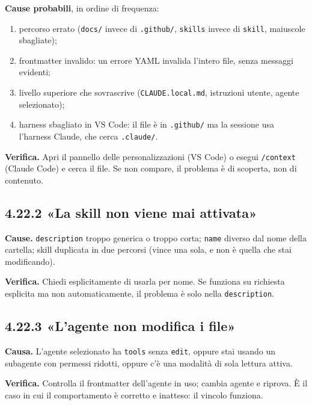 \documentclass[
  italian,
  10pt,
]{book}
\providecommand{\tightlist}{%
  \setlength{\itemsep}{0pt}\setlength{\parskip}{0pt}}
\begin{document}
\textbf{Cause probabili}, in ordine di frequenza:

\begin{enumerate}
\def\labelenumi{\arabic{enumi}.}
\tightlist
\item
  percorso errato (\texttt{docs/} invece di \texttt{.github/},
  \texttt{skills} invece di \texttt{skill}, maiuscole sbagliate);
\item
  frontmatter invalido: un errore YAML invalida l'intero file, senza
  messaggi evidenti;
\item
  livello superiore che sovrascrive (\texttt{CLAUDE.local.md},
  istruzioni utente, agente selezionato);
\item
  harness sbagliato in VS Code: il file è in \texttt{.github/} ma la
  sessione usa l'harness Claude, che cerca \texttt{.claude/}.
\end{enumerate}

\textbf{Verifica.} Apri il pannello delle personalizzazioni (VS Code) o
esegui \texttt{/context} (Claude Code) e cerca il file. Se non compare,
il problema è di scoperta, non di contenuto.

\subsection{4.22.2 «La skill non viene mai
attivata»}\label{la-skill-non-viene-mai-attivata}

\textbf{Cause.} \texttt{description} troppo generica o troppo corta;
\texttt{name} diverso dal nome della cartella; skill duplicata in due
percorsi (vince una sola, e non è quella che stai modificando).

\textbf{Verifica.} Chiedi esplicitamente di usarla per nome. Se funziona
su richiesta esplicita ma non automaticamente, il problema è solo nella
\texttt{description}.

\subsection{4.22.3 «L'agente non modifica i
file»}\label{lagente-non-modifica-i-file}

\textbf{Causa.} L'agente selezionato ha \texttt{tools} senza
\texttt{edit}, oppure stai usando un subagente con permessi ridotti,
oppure c'è una modalità di sola lettura attiva.

\textbf{Verifica.} Controlla il frontmatter dell'agente in uso; cambia
agente e riprova. È il caso in cui il comportamento è corretto e
inatteso: il vincolo funziona.
\end{document}
